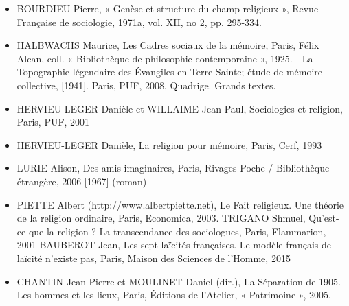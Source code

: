 \begin{itemize}
\item BOURDIEU Pierre, « Genèse et structure du champ religieux », Revue Française de   sociologie, 1971a, vol. XII, no 2, pp. 295-334. 
\item HALBWACHS Maurice, Les Cadres sociaux de la mémoire, Paris, Félix Alcan, coll.  « Bibliothèque de philosophie contemporaine », 1925.  -  La Topographie légendaire des Évangiles en Terre Sainte; étude de mémoire collective, [1941]. Paris, PUF, 2008,  Quadrige. Grands textes. 
\item HERVIEU-LEGER Danièle et WILLAIME Jean-Paul, Sociologies et religion, Paris, PUF,  2001  
\item HERVIEU-LEGER Danièle, La religion pour mémoire, Paris, Cerf, 1993 
\item LURIE Alison, Des amis imaginaires, Paris,  Rivages Poche / Bibliothèque étrangère,  2006 [1967] (roman) 
\item PIETTE Albert (http://www.albertpiette.net), Le Fait religieux. Une théorie de la religion  ordinaire, Paris, Economica, 2003. TRIGANO Shmuel, Qu’est-ce que la religion ? La transcendance des sociologues, Paris,   Flammarion, 2001  BAUBEROT Jean, Les sept laïcités françaises. Le modèle français de laïcité n'existe pas,  Paris, Maison des Sciences de l'Homme, 2015 
\item CHANTIN Jean-Pierre et MOULINET Daniel (dir.), La Séparation de 1905. Les hommes  et les lieux, Paris, Éditions de l’Atelier, « Patrimoine », 2005. 


\end{itemize}
